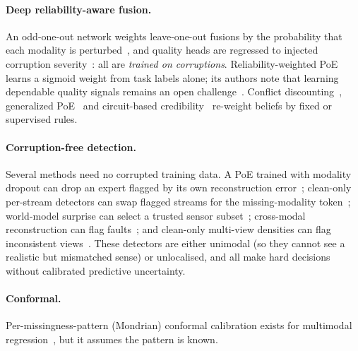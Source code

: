 \documentclass[10pt,twocolumn]{article}
\begin{document}
\paragraph{Deep reliability-aware fusion.} An odd-one-out network weights leave-one-out fusions by the probability
that each modality is perturbed~\cite{yang2021defending}, and quality heads are regressed to injected corruption
severity~\cite{kumar2026prime,wu2026electronics}: all are \emph{trained on corruptions}. Reliability-weighted PoE learns
a sigmoid weight from task labels alone; its authors note that learning dependable quality signals remains an open
challenge~\cite{palo2026reliability}. Conflict discounting~\cite{bezirganyan2025discounted}, generalized
PoE~\cite{cao2014gpoe} and circuit-based credibility~\cite{tenali2026c2mf} re-weight beliefs by fixed or supervised rules.
\paragraph{Corruption-free detection.} Several methods need no corrupted training data. A PoE trained with modality
dropout can drop an expert flagged by its own reconstruction error~\cite{lee2020detect}; clean-only per-stream detectors
can swap flagged streams for the missing-modality token~\cite{mohapatra2026carat}; world-model surprise can select a
trusted sensor subset~\cite{zollicoffer2025wiser}; cross-modal reconstruction can flag faults~\cite{jensen2026fault}; and
clean-only multi-view densities can flag inconsistent views~\cite{wang2020hbmvad}. These detectors are either unimodal
(so they cannot see a realistic but mismatched sense) or unlocalised, and all make hard decisions without calibrated
predictive uncertainty.
\paragraph{Conformal.} Per-missingness-pattern (Mondrian) conformal calibration exists for multimodal
regression~\cite{azizi2026conformal,mccf2026}, but it assumes the pattern is known.
\end{document}
